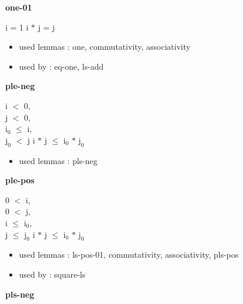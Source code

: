 \documentclass[a4paper]{article}
\begin{document}
\medskip

\bigskip

{\large\bf one-01}

\medskip

 \Fol i = 1 \Imp i $*$ j = j

\begin{itemize}


\item       used lemmas  : one, commutativity, associativity
\item       used by      : eq-one, ls-add

\end{itemize}

\medskip

\bigskip

{\large\bf ple-neg}

\medskip

i $<$ 0, \\
j $<$ 0, \\
$\mbox{i}_{0}$ $\le$ i, \\
$\mbox{j}_{0}$ $<$ j \Fol i $*$ j $\le$ $\mbox{i}_{0}$ $*$ $\mbox{j}_{0}$

\begin{itemize}


\item       used lemmas  : pls-neg

\end{itemize}

\medskip

\bigskip

{\large\bf ple-pos}

\medskip

0 $<$ i, \\
0 $<$ j, \\
i $\le$ $\mbox{i}_{0}$, \\
j $\le$ $\mbox{j}_{0}$ \Fol i $*$ j $\le$ $\mbox{i}_{0}$ $*$ $\mbox{j}_{0}$

\begin{itemize}


\item       used lemmas  : ls-pos-01, commutativity, associativity, pls-pos
\item       used by      : square-ls

\end{itemize}

\medskip

\bigskip

{\large\bf pls-neg}

\medskip
\end{document}
